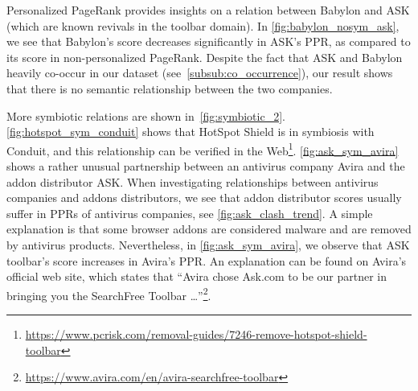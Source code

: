 \documentclass[11pt,oneside]{book}
\begin{document}
Personalized PageRank provides insights on a relation between Babylon and ASK (which are known revivals in the toolbar domain). In \autoref{fig:babylon_nosym_ask}, we see that Babylon's score decreases significantly in ASK's PPR, as compared to its score in non-personalized PageRank. Despite the fact that ASK and Babylon heavily co-occur in our dataset (see~\autoref{subsub:co_occurrence}), our result shows that there is no semantic relationship between the two companies. 

More symbiotic relations are shown in~\autoref{fig:symbiotic_2}. \autoref{fig:hotspot_sym_conduit} shows that HotSpot Shield is in symbiosis with Conduit, and this relationship can be verified in the Web\footnote{\url{https://www.pcrisk.com/removal-guides/7246-remove-hotspot-shield-toolbar}}. \autoref{fig:ask_sym_avira} shows a rather unusual partnership between an antivirus company Avira and the addon distributor ASK. When investigating relationships between antivirus companies and addons distributors, we see that addon distributor scores usually suffer in PPRs of antivirus companies, see \autoref{fig:ask_clash_trend}. A simple explanation is that some browser addons are considered malware and are removed by antivirus products. Nevertheless, in \autoref{fig:ask_sym_avira}, we observe that ASK toolbar's score increases in Avira's PPR. An explanation can be found on Avira's official web site, which states that ``Avira chose Ask.com to be our partner in bringing you the SearchFree Toolbar \dots''\footnote{\url{https://www.avira.com/en/avira-searchfree-toolbar}}. 
\end{document}

